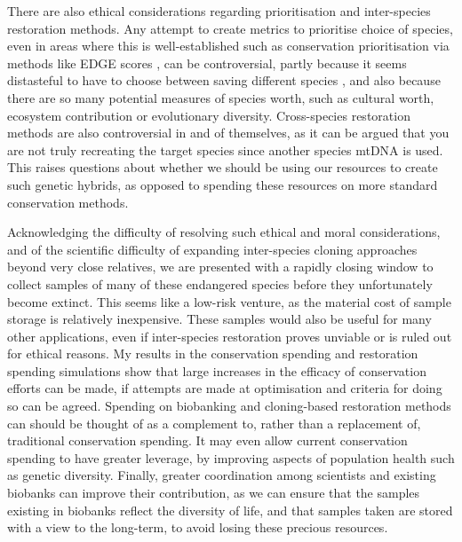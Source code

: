 \documentclass[10pt]{article}
\begin{document}
	
	
	There are also ethical considerations regarding prioritisation and inter-species
	restoration methods.
	Any attempt to create metrics to prioritise choice of species, even in areas
	where this is well-established such as conservation prioritisation via methods
	like EDGE scores \citep{isaacMammalsEDGEConservation2007}, can be controversial,
	partly because it seems distasteful to have to choose between saving different
	species \citep{bottrillConservationTriageJust2008},
	and also because there are so many potential measures of species worth,
	such as cultural worth, ecosystem contribution or evolutionary diversity.
	Cross-species restoration methods are also controversial in and of themselves,
	as it can be argued that you are not truly recreating the target species since
	another species mtDNA is used. This raises questions about whether we should
	be using our resources to create such genetic hybrids, as opposed to spending
	these resources on more standard conservation methods.
	
	Acknowledging the difficulty of resolving such ethical and moral considerations,
	and of the scientific difficulty of expanding inter-species cloning approaches
	beyond very close relatives, we are presented with a rapidly
	closing window to collect samples of many of these endangered species before
	they unfortunately become extinct. This seems like a low-risk venture, as the
	material cost of sample storage is relatively inexpensive. These samples would
	also be useful for many other applications, even if inter-species restoration
	proves unviable or is ruled out for ethical reasons. My results
	in the conservation spending and restoration spending simulations show that
	large increases in the efficacy of conservation efforts can be made, if attempts
	are made at optimisation and criteria for doing so can be
	agreed. Spending on biobanking and cloning-based restoration methods can
	should be thought of as a complement to, rather than a replacement of,
	traditional conservation spending. It may even allow current conservation
	spending to have greater leverage, by improving aspects of population health
	such as genetic diversity.
	Finally, greater coordination among scientists and existing biobanks
	can improve their contribution, as we can ensure that the samples existing in
	biobanks reflect the diversity of life, and that samples taken are stored with
	a view to the long-term, to avoid losing these precious resources.
	
\end{document}
